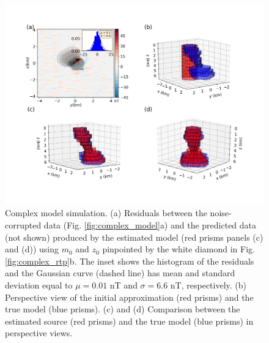 \begin{figure}
    \centering
    \includegraphics[width=\linewidth]{figures/complex_results.png}
    \caption{Complex model simulation. (a) Residuals between the noise-corrupted data (Fig. \ref{fig:complex_model}a) and the predicted data (not shown) produced by the estimated model (red prisms panels (c) and (d)) using $m_0$  and $z_0$ pinpointed by the white diamond in Fig. \ref{fig:complex_rtp}b.
    The inset shows the histogram of the residuals and the Gaussian curve (dashed line) has mean and standard deviation equal to $\mu = 0.01$ nT and $\sigma=6.6$ nT, respectively.  (b) Perspective view of the initial approximation (red prisms) and the true model (blue prisms). (c) and (d) Comparison between the estimated source (red prisms) and the true model (blue prisms) in perspective views. 
}
    \label{fig:complex_result}
\end{figure}


